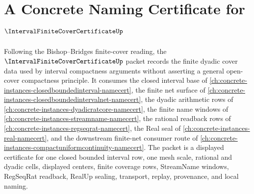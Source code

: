 \chapter{A Concrete Naming Certificate for $\IntervalFiniteCoverCertificateUp$}
\label{ch:concrete-instances-interval-finite-cover-certificate-namecert}

Following the Bishop--Bridges finite-cover reading, the $\IntervalFiniteCoverCertificateUp$ packet records the finite dyadic cover data used by interval compactness arguments without asserting a general open-cover compactness principle. It consumes the closed interval base of \autoref{ch:concrete-instances-closedboundedinterval-namecert}, the finite net surface of \autoref{ch:concrete-instances-closedboundedintervalnet-namecert}, the dyadic arithmetic rows of \autoref{ch:concrete-instances-dyadicratcore-namecert}, the finite name windows of \autoref{ch:concrete-instances-streamname-namecert}, the rational readback rows of \autoref{ch:concrete-instances-regseqrat-namecert}, the Real seal of \autoref{ch:concrete-instances-real-namecert}, and the downstream finite-net consumer route of \autoref{ch:concrete-instances-compactuniformcontinuity-namecert}. The packet is a displayed certificate for one closed bounded interval row, one mesh scale, rational and dyadic cells, displayed centers, finite coverage rows, StreamName windows, RegSeqRat readback, RealUp sealing, transport, replay, provenance, and local naming.

